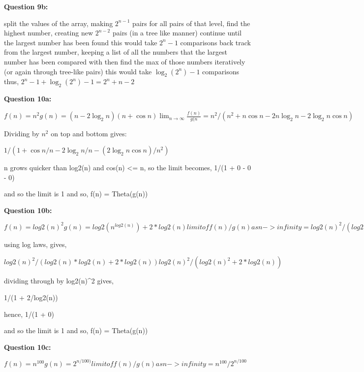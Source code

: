 \documentclass{article}
\begin{document}
\textbf{Question 9b:}

split the values of the array, making \(2^{n-1}\) pairs
for all pairs of that level, find the highest number, creating new \(2^{n-2}\) pairs (in a tree like manner)
continue until the largest number has been found
this would take \(2^{n} - 1\) comparisons
back track from the largest number, keeping a list of all the numbers that the largest number has been compared with
then find the max of those numbers iteratively (or again through tree-like pairs)
this would take \(\log_2 (2^{n}) - 1\) comparisons
thus, \(2^{n} - 1 + \log_2 (2^{n}) - 1 = 2^{n} + n - 2\)

\textbf{Question 10a:}

\begin{math}
    f(n) = n^{2}
    g(n) = (n - 2 \log_2 n )(n + \cos n )
    \lim_{n \to \infty} \frac{f(n)}{g(n} = n^{2}/(n^{2} + n\cos n - 2 n \log_2 n - 2 \log_2 n \cos n )
\end{math}

Dividing by \(n^{2}\) on top and bottom gives:

\(1/(1 + \cos n /n - 2 \log_2 n /n - (2 \log_2 n \cos n )/n^{2})\)

n grows quicker than log2(n) and cos(n) <= n, so the limit becomes,
1/(1 + 0 - 0 - 0)

and so the limit is 1
and so, f(n) = Theta(g(n))

\textbf{Question 10b:}

\begin{math}
f(n) = log2(n)^{2}
g(n) = log2(n^{log2(n)}) + 2*log2(n)

limit of f(n)/g(n) as n -> infinity = log2(n)^{2}/(log2(n^{log2(n)}) + 2*log2(n))
\end{math}

using log laws, gives,

\begin{math}
log2(n)^{2}/(log2(n)*log2(n) + 2*log2(n))
log2(n)^{2}/(log2(n)^{2} + 2*log2(n))
\end{math}

dividing through by log2(n)^2 gives,

1/(1 + 2/log2(n))

hence,
1/(1 + 0)

and so the limit is 1
and so, f(n) = Theta(g(n))

\textbf{Question 10c:}

\begin{math}
f(n) = n^{100}
g(n) = 2^{n/100)}

limit of f(n)/g(n) as n -> infinity = n^{100}/2^{n/100}
\end{math}
\end{document}
